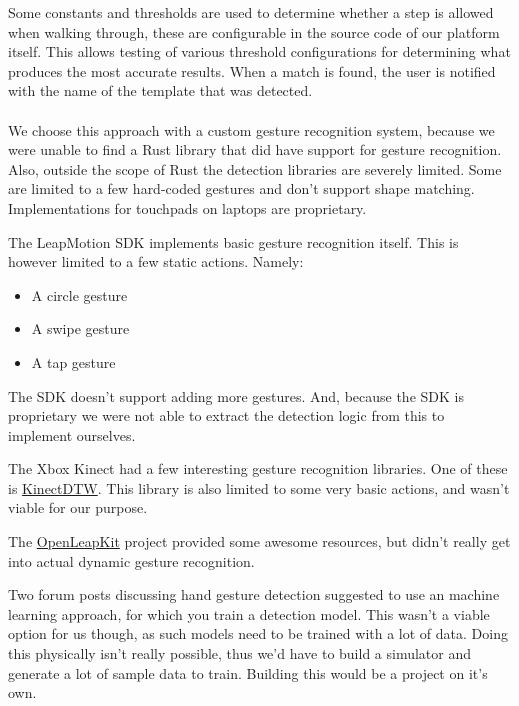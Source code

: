 \documentclass{standalone}
\begin{document}
  Some constants and thresholds are used to determine whether a
  step is allowed when walking through, these are configurable in the source
  code of our platform itself. This allows testing of various threshold
  configurations for determining what produces the most accurate results.
  When a match is found, the user is notified with the name of the template that
  was detected.

  \paragraph{}
  We choose this approach with a custom gesture recognition system, because we
  were unable to find a Rust library that did have support for gesture
  recognition. Also, outside the scope of Rust the detection libraries are
  severely limited. Some are limited to a few hard-coded gestures and don't
  support shape matching. Implementations for touchpads on laptops are
  proprietary.

  The LeapMotion SDK implements basic gesture recognition itself. This is
  however limited to a few static actions. Namely:
  \begin{itemize}
    \tightlist{}
    \item A circle gesture
    \item A swipe gesture
    \item A tap gesture
  \end{itemize}
  The SDK doesn't support adding more gestures. And, because the SDK is
  proprietary we were not able to extract the detection logic from this to
  implement ourselves.

  The Xbox Kinect had a few interesting gesture recognition libraries. One of
  these is \href{https://archive.codeplex.com/?p=kinectdtw}{KinectDTW}. This
  library is also limited to some very basic actions, and wasn't viable for our
  purpose.

  The
  \href{https://forums.leapmotion.com/t/openleapkit-updated-leap-motion-controller-toolkit-for-common-needs/289}{OpenLeapKit}
  project provided some awesome resources, but didn't really get into actual
  dynamic gesture recognition.

  Two forum posts discussing hand gesture detection suggested to use an machine
  learning approach, for which you train a detection model. This wasn't a viable
  option for us though, as such models need to be trained with a lot of data.
  Doing this physically isn't really possible, thus we'd have to build a
  simulator and generate a lot of sample data to train. Building this would be a
  project on it's own.
\end{document}
